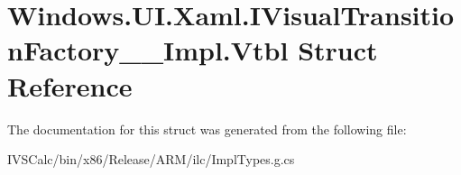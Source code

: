\hypertarget{struct_windows_1_1_u_i_1_1_xaml_1_1_i_visual_transition_factory_____impl_1_1_vtbl}{}\section{Windows.\+U\+I.\+Xaml.\+I\+Visual\+Transition\+Factory\+\_\+\+\_\+\+Impl.\+Vtbl Struct Reference}
\label{struct_windows_1_1_u_i_1_1_xaml_1_1_i_visual_transition_factory_____impl_1_1_vtbl}


The documentation for this struct was generated from the following file\+:\begin{DoxyCompactItemize}
\item 
I\+V\+S\+Calc/bin/x86/\+Release/\+A\+R\+M/ilc/Impl\+Types.\+g.\+cs\end{DoxyCompactItemize}
